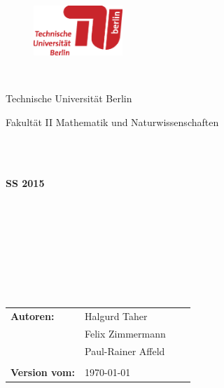


%


\thispagestyle{empty}

\begin{figure}[t]

 \includegraphics[width=0.3\textwidth]{abb/misc/TULogo.eps}
~~~~~~~~~~
\end{figure}


\begin{verbatim}


\end{verbatim}

\begin{center}
\Large{Technische Universität Berlin}\\
\end{center}


\begin{center}
\Large{Fakultät II Mathematik und Naturwissenschaften}
\end{center}
\begin{verbatim}


\end{verbatim}
\begin{center}
\doublespacing
\textbf{\LARGE{\titleDocument\\SS 2015}}\\
\singlespacing
\begin{verbatim}

\end{verbatim}
\textbf{{~\subjectDocument}}
\end{center}
\begin{verbatim}

\end{verbatim}
\begin{center}

\end{center}
\begin{verbatim}





\end{verbatim}
\begin{flushleft}
\begin{tabular}{llll}
\textbf{Autoren:} &  Halgurd Taher &\\& Felix Zimmermann& \\
&  Paul-Rainer Affeld & \\
& & \\
\textbf{Version vom:}  & \today &
\end{tabular}
\end{flushleft}